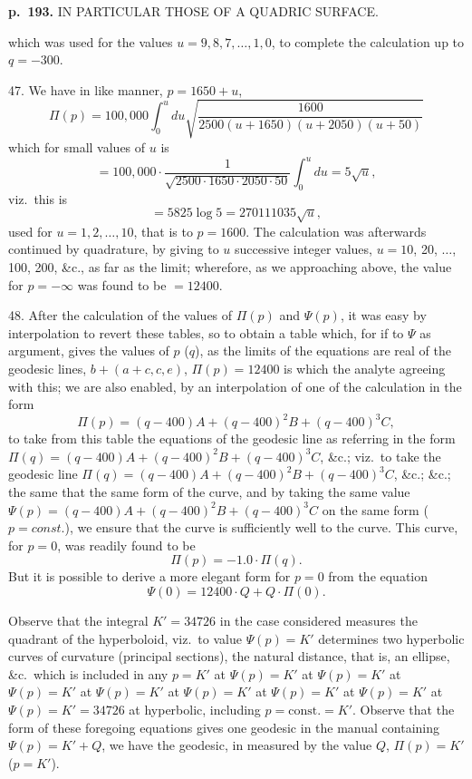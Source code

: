 \documentclass[11pt,a4paper]{book}
\begin{document}
\clearpage

\noindent
\textbf{p.~193.}  IN PARTICULAR THOSE OF A QUADRIC SURFACE.

which was used for the values $u = 9, 8, 7, \ldots, 1, 0$, to complete the calculation up to $q = -300$.

47. We have in like manner, $p = 1650 + u$,
\[
\Pi(p) = 100,000 \int_0^{u} du \sqrt{\frac{1600}{2500(u + 1650)(u + 2050)(u + 50)}}
\]
which for small values of $u$ is
\[
= 100,000 \cdot \frac{1}{\sqrt{2500 \cdot 1650 \cdot 2050 \cdot 50}} \int_0^u du = 5\sqrt{u},
\]
viz.\ this is
\[
= 5825 \log 5 = 270111035\sqrt{u},
\]
used for $u = 1, 2, \ldots, 10$, that is to $p = 1600$. The calculation was afterwards continued by quadrature, by giving to $u$ successive integer values, $u = 10$, 20, $\ldots$, 100, 200, \&c., as far as the limit; wherefore, as we approaching above, the value for $p = -\infty$ was found to be $= 12400$.

48. After the calculation of the values of $\Pi(p)$ and $\Psi(p)$, it was easy by interpolation to revert these tables, so to obtain a table which, for if to $\Psi$ as argument, gives the values of $p$ ($q$), as the limits of the equations are real of the geodesic lines, $b + (a + c, c, e)$, $\Pi(p) = 12400$ is which the analyte agreeing with this; we are also enabled, by an interpolation of one of the calculation in the form
\[
\Pi(p) = (q - 400)A + (q - 400)^2B + (q - 400)^3C,
\]
to take from this table the equations of the geodesic line as referring in the form $\Pi(q) = (q - 400)A + (q - 400)^2B + (q - 400)^3C$, \&c.; viz.\ to take the geodesic line $\Pi(q) = (q - 400)A + (q - 400)^2B + (q - 400)^3C$, \&c.; \&c.; the same that the same form of the curve, and by taking the same value $\Psi(p) = (q - 400)A + (q - 400)^2B + (q - 400)^3C$ on the same form ($p = const.$), we ensure that the curve is sufficiently well to the curve.  This curve, for $p = 0$, was readily found to be
\[
\Pi(p) = -1.0 \cdot \Pi(q).
\]
But it is possible to derive a more elegant form for $p = 0$ from the equation
\[
\Psi(0) = 12400 \cdot Q + Q \cdot \Pi(0).
\]

Observe that the integral $K' = 34726$ in the case considered measures the quadrant of the hyperboloid, viz.\ to value $\Psi(p) = K'$ determines two hyperbolic curves of curvature (principal sections), the natural distance, that is, an ellipse, \&c.\ which is included in any $p = K'$ at $\Psi(p) = K'$ at $\Psi(p) = K'$ at $\Psi(p) = K'$ at $\Psi(p) = K'$ at $\Psi(p) = K'$ at $\Psi(p) = K'$ at $\Psi(p) = K'$ at $\Psi(p) = K' = 34726$ at hyperbolic, including $p = \mathrm{const.} = K'$.  Observe that the form of these foregoing equations gives one geodesic in the manual containing $\Psi(p) = K' + Q$, we have the geodesic, in measured by the value $Q$, $\Pi(p) = K'$ ($p = K'$).
\end{document}
